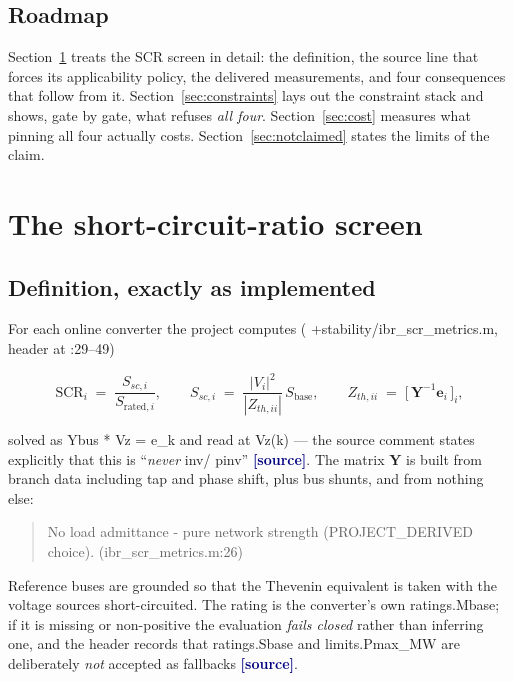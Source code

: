 \documentclass[12pt,a4paper]{article}
\theoremstyle{remark}
\newcommand{\code}[1]{{\ttfamily\small\hyphenchar\font=-1 #1}}
\newcommand{\sourcecode}{\textcolor{navy}{\textbf{[source]}}}
\begin{document}
\subsection{Roadmap}

Section~\ref{sec:scr} treats the SCR screen in detail: the definition, the
source line that forces its applicability policy, the delivered measurements, and
four consequences that follow from it. Section~\ref{sec:constraints} lays out the
constraint stack and shows, gate by gate, what refuses \emph{all four}.
Section~\ref{sec:cost} measures what pinning all four actually costs.
Section~\ref{sec:notclaimed} states the limits of the claim.

\section{The short-circuit-ratio screen}\label{sec:scr}

\subsection{Definition, exactly as implemented}

For each online converter the project computes
(\code{+stability/ibr\_scr\_metrics.m}, header at \code{:29--49})

\begin{equation}
\mathrm{SCR}_i \;=\; \frac{S_{sc,i}}{S_{\mathrm{rated},i}},
\qquad
S_{sc,i} \;=\; \frac{|V_i|^2}{|Z_{th,ii}|}\,S_{\text{base}},
\qquad
Z_{th,ii} \;=\; \bigl[\,\mathbf{Y}^{-1}\mathbf{e}_i\,\bigr]_i ,
\label{eq:scr}
\end{equation}

solved as \code{Ybus * Vz = e\_k} and read at \code{Vz(k)} --- the source
comment states explicitly that this is ``\emph{never} \code{inv}/\code{pinv}''
\sourcecode. The matrix $\mathbf{Y}$ is built from branch data including tap and
phase shift, plus bus shunts, and from nothing else:

\begin{quote}\small
\code{No load admittance - pure network strength (PROJECT\_DERIVED choice).}
\code{\hfill(ibr\_scr\_metrics.m:26)}
\end{quote}

Reference buses are grounded so that the Thevenin equivalent is taken with the
voltage sources short-circuited. The rating is the converter's own
\code{ratings.Mbase}; if it is missing or non-positive the evaluation
\emph{fails closed} rather than inferring one, and the header records that
\code{ratings.Sbase} and \code{limits.Pmax\_MW} are deliberately \emph{not}
accepted as fallbacks \sourcecode.
\end{document}
